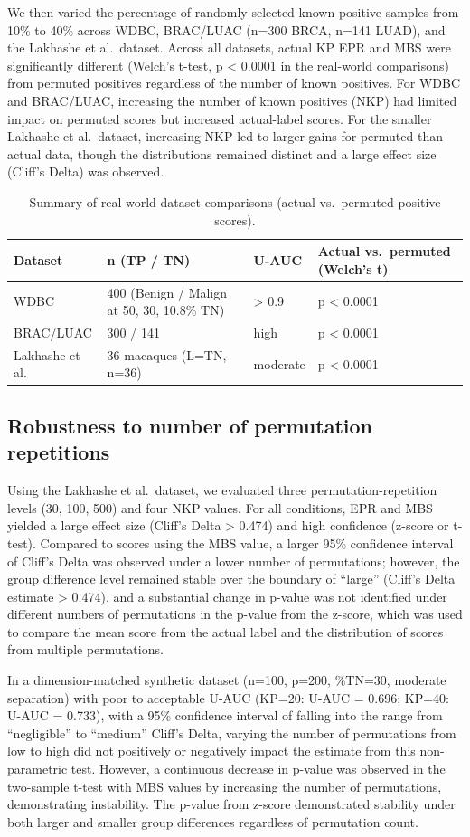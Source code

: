 \documentclass[11pt]{article}
\begin{document}
We then varied the percentage of randomly selected known positive samples from 10\% to 40\% across WDBC, BRAC/LUAC (n=300 BRCA, n=141 LUAD), and the Lakhashe et al.\ dataset. Across all datasets, actual KP EPR and MBS were significantly different (Welch's t-test, p < 0.0001 in the real-world comparisons) from permuted positives regardless of the number of known positives. For WDBC and BRAC/LUAC, increasing the number of known positives (NKP) had limited impact on permuted scores but increased actual-label scores. For the smaller Lakhashe et al.\ dataset, increasing NKP led to larger gains for permuted than actual data, though the distributions remained distinct and a large effect size (Cliff's Delta) was observed.

\begin{table}[h]
\centering
\caption{Summary of real-world dataset comparisons (actual vs.\ permuted positive scores).}
\begin{tabular}{llll}
\toprule
Dataset & n (TP / TN) & U-AUC & Actual vs.\ permuted (Welch's t) \\
\midrule
WDBC & 400 (Benign / Malign at 50, 30, 10.8\% TN) & > 0.9 & p < 0.0001 \\
BRAC/LUAC & 300 / 141 & high & p < 0.0001 \\
Lakhashe et al. & 36 macaques (L=TN, n=36) & moderate & p < 0.0001 \\
\bottomrule
\end{tabular}
\end{table}

\subsection{Robustness to number of permutation repetitions}
Using the Lakhashe et al.\ dataset, we evaluated three permutation-repetition levels (30, 100, 500) and four NKP values. For all conditions, EPR and MBS yielded a large effect size (Cliff's Delta > 0.474) and high confidence (z-score or t-test). Compared to scores using the MBS value, a larger 95\% confidence interval of Cliff's Delta was observed under a lower number of permutations; however, the group difference level remained stable over the boundary of ``large'' (Cliff's Delta estimate > 0.474), and a substantial change in p-value was not identified under different numbers of permutations in the p-value from the z-score, which was used to compare the mean score from the actual label and the distribution of scores from multiple permutations.

In a dimension-matched synthetic dataset (n=100, p=200, \%TN=30, moderate separation) with poor to acceptable U-AUC (KP=20: U-AUC = 0.696; KP=40: U-AUC = 0.733), with a 95\% confidence interval of falling into the range from ``negligible'' to ``medium'' Cliff's Delta, varying the number of permutations from low to high did not positively or negatively impact the estimate from this non-parametric test. However, a continuous decrease in p-value was observed in the two-sample t-test with MBS values by increasing the number of permutations, demonstrating instability. The p-value from z-score demonstrated stability under both larger and smaller group differences regardless of permutation count.
\end{document}
